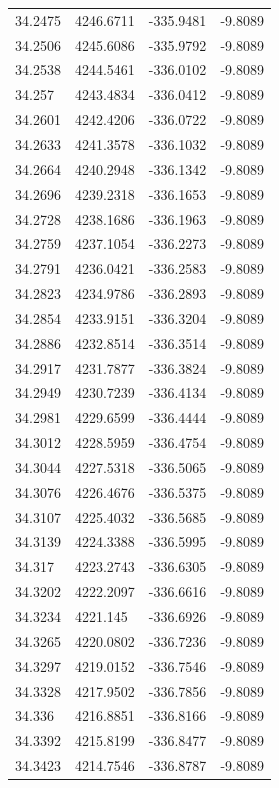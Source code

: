 \begin{table}[H]
\begin{tabular}{llll}
34.2475 & 4246.6711 & -335.9481 & -9.8089 \\
34.2506 & 4245.6086 & -335.9792 & -9.8089 \\
34.2538 & 4244.5461 & -336.0102 & -9.8089 \\
34.257 & 4243.4834 & -336.0412 & -9.8089 \\
34.2601 & 4242.4206 & -336.0722 & -9.8089 \\
34.2633 & 4241.3578 & -336.1032 & -9.8089 \\
34.2664 & 4240.2948 & -336.1342 & -9.8089 \\
34.2696 & 4239.2318 & -336.1653 & -9.8089 \\
34.2728 & 4238.1686 & -336.1963 & -9.8089 \\
34.2759 & 4237.1054 & -336.2273 & -9.8089 \\
34.2791 & 4236.0421 & -336.2583 & -9.8089 \\
34.2823 & 4234.9786 & -336.2893 & -9.8089 \\
34.2854 & 4233.9151 & -336.3204 & -9.8089 \\
34.2886 & 4232.8514 & -336.3514 & -9.8089 \\
34.2917 & 4231.7877 & -336.3824 & -9.8089 \\
34.2949 & 4230.7239 & -336.4134 & -9.8089 \\
34.2981 & 4229.6599 & -336.4444 & -9.8089 \\
34.3012 & 4228.5959 & -336.4754 & -9.8089 \\
34.3044 & 4227.5318 & -336.5065 & -9.8089 \\
34.3076 & 4226.4676 & -336.5375 & -9.8089 \\
34.3107 & 4225.4032 & -336.5685 & -9.8089 \\
34.3139 & 4224.3388 & -336.5995 & -9.8089 \\
34.317 & 4223.2743 & -336.6305 & -9.8089 \\
34.3202 & 4222.2097 & -336.6616 & -9.8089 \\
34.3234 & 4221.145 & -336.6926 & -9.8089 \\
34.3265 & 4220.0802 & -336.7236 & -9.8089 \\
34.3297 & 4219.0152 & -336.7546 & -9.8089 \\
34.3328 & 4217.9502 & -336.7856 & -9.8089 \\
34.336 & 4216.8851 & -336.8166 & -9.8089 \\
34.3392 & 4215.8199 & -336.8477 & -9.8089 \\
34.3423 & 4214.7546 & -336.8787 & -9.8089 \\

\end{tabular}
\end{table}
